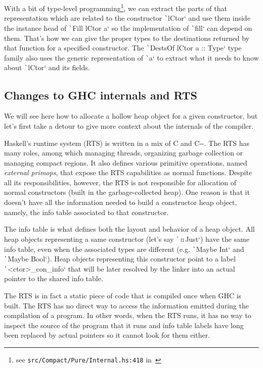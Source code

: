 \documentclass[english]{jflart}
\begin{document}
With a bit of type-level programming\footnote{see \texttt{src/Compact/Pure/Internal.hs:418} in~\cite{linear_dest}}, we can extract the parts of that representation which are related to the constructor \texttt`lCtor` and use them inside the instance head of \texttt`Fill lCtor a` so the implementation of \texttt`fill` can depend on them. That's how we can give the proper types to the destinations returned by that function for a specified constructor. The \texttt`DestsOf lCtor a :: Type` type family also uses the generic representation of \texttt`a` to extract what it needs to know about \texttt`lCtor` and its fields.

\subsection{Changes to GHC internals and RTS}\label{ssec:impl-ghc}

We will see here how to allocate a hollow heap object for a given constructor, but let's first take a detour to give more context about the internals of the compiler.

Haskell's runtime system (RTS) is written in a mix of C and C-{}-. The RTS has many roles, among which managing threads, organizing garbage collection or managing compact regions. It also defines various primitive operations, named \emph{external primops}, that expose the RTS capabilities as normal functions. Despite all its responsibilities, however, the RTS is not responsible for allocation of normal constructors (built in the garbage-collected heap). One reason is that it doesn't have all the information needed to build a constructor heap object, namely, the info table associated to that constructor.

The info table is what defines both the layout and behavior of a heap object. All heap objects representing a same constructor (let's say \texttt`¤Just`) have the same info table, even when the associated types are different (e.g. \texttt`Maybe Int` and \texttt`Maybe Bool`). Heap objects representing this constructor point to a label \texttt`<ctor>_con_info` that will be later resolved by the linker into an actual pointer to the shared info table.

The RTS is in fact a static piece of code that is compiled once when GHC is built. The RTS has no direct way to access the information emitted during the compilation of a program. In other words, when the RTS runs, it has no way to inspect the source of the program that it runs and info table labels have long been replaced by actual pointers so it cannot look for them either.
\end{document}
